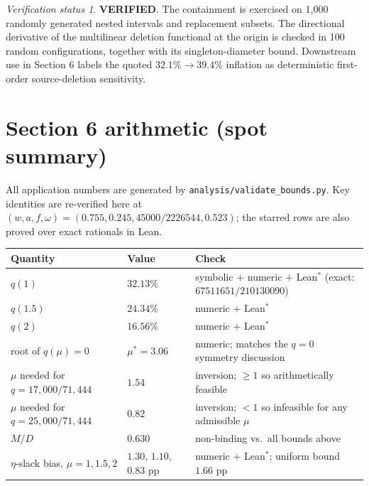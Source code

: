 \documentclass[11pt,a4paper]{article}
\theoremstyle{plain}
\theoremstyle{remark}
\newtheorem*{verification}{Verification status}
\newcommand{\PASS}{\textcolor{green!50!black}{\textbf{VERIFIED}}}
\begin{document}
\begin{verification}
\PASS. The containment is exercised on 1{,}000 randomly generated nested intervals and replacement subsets. The directional derivative of the multilinear deletion functional at the origin is checked in 100 random configurations, together with its singleton-diameter bound. Downstream use in Section 6 labels the quoted $32.1\%\to39.4\%$ inflation as deterministic first-order source-deletion sensitivity.
\end{verification}

\section{Section 6 arithmetic (spot summary)}

All application numbers are generated by \texttt{analysis/validate\_bounds.py}. Key identities are re-verified here at $(w,a,f,\omega)=(0.755,0.245,45000/2226544,0.523)$; the starred rows are also proved over exact rationals in Lean.
\begin{center}
\begin{small}
\begin{tabular}{@{}lll@{}}
\toprule
Quantity & Value & Check \\
\midrule
$q(1)$ & $32.13\%$ & symbolic $+$ numeric $+$ Lean$^\ast$ (exact: $67511651/210130090$) \\
$q(1.5)$ & $24.34\%$ & numeric $+$ Lean$^\ast$ \\
$q(2)$ & $16.56\%$ & numeric $+$ Lean$^\ast$ \\
root of $q(\mu)=0$ & $\mu^\ast=3.06$ & numeric; matches the $q{=}0$ symmetry discussion \\
$\mu$ needed for $q=17{,}000/71{,}444$ & $1.54$ & inversion; $\ge 1$ so arithmetically feasible \\
$\mu$ needed for $q=25{,}000/71{,}444$ & $0.82$ & inversion; $<1$ so infeasible for any admissible $\mu$ \\
$M/D$ & $0.630$ & non-binding vs.\ all bounds above \\
$\eta$-slack bias, $\mu{=}1,1.5,2$ & $1.30$, $1.10$, $0.83$ pp & numeric $+$ Lean$^\ast$; uniform bound $1.66$ pp \\
\bottomrule
\end{tabular}
\end{small}
\end{center}
\end{document}
